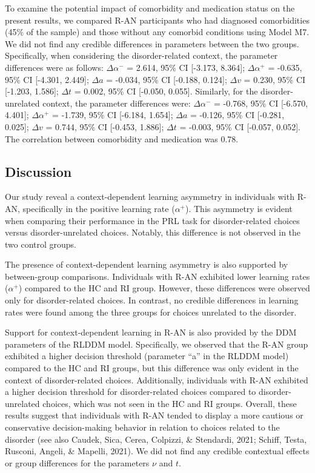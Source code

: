 \documentclass[
  man,floatsintext]{apa6}
\begin{document}
To examine the potential impact of comorbidity and medication status on the present results, we compared R-AN participants who had diagnosed comorbidities (45\% of the sample) and those without any comorbid conditions using Model M7. We did not find any credible differences in parameters between the two groups. Specifically, when considering the disorder-related context, the parameter differences were as follows: \(\Delta \alpha^-\) = 2.614, 95\% CI {[}-3.173, 8.364{]}; \(\Delta \alpha^+\) = -0.635, 95\% CI {[}-4.301, 2.449{]}; \(\Delta a\) = -0.034, 95\% CI {[}-0.188, 0.124{]}; \(\Delta v\) = 0.230, 95\% CI {[}-1.203, 1.586{]}; \(\Delta t\) = 0.002, 95\% CI {[}-0.050, 0.055{]}. Similarly, for the disorder-unrelated context, the parameter differences were: \(\Delta \alpha^-\) = -0.768, 95\% CI {[}-6.570, 4.401{]}; \(\Delta \alpha^+\) = -1.739, 95\% CI {[}-6.184, 1.654{]}; \(\Delta a\) = -0.126, 95\% CI {[}-0.281, 0.025{]}; \(\Delta v\) = 0.744, 95\% CI {[}-0.453, 1.886{]}; \(\Delta t\) = -0.003, 95\% CI {[}-0.057, 0.052{]}. The correlation between comorbidity and medication was 0.78.

\hypertarget{discussion}{%
\subsection{Discussion}\label{discussion}}

Our study reveal a context-dependent learning asymmetry in individuals with R-AN, specifically in the positive learning rate (\(\alpha^+\)). This asymmetry is evident when comparing their performance in the PRL task for disorder-related choices versus disorder-unrelated choices. Notably, this difference is not observed in the two control groups.

The presence of context-dependent learning asymmetry is also supported by between-group comparisons. Individuals with R-AN exhibited lower learning rates (\(\alpha^+\)) compared to the HC and RI group. However, these differences were observed only for disorder-related choices. In contrast, no credible differences in learning rates were found among the three groups for choices unrelated to the disorder.

Support for context-dependent learning in R-AN is also provided by the DDM parameters of the RLDDM model. Specifically, we observed that the R-AN group exhibited a higher decision threshold (parameter ``a'' in the RLDDM model) compared to the HC and RI groups, but this difference was only evident in the context of disorder-related choices. Additionally, individuals with R-AN exhibited a higher decision threshold for disorder-related choices compared to disorder-unrelated choices, which was not seen in the HC and RI groups. Overall, these results suggest that individuals with R-AN tended to display a more cautious or conservative decision-making behavior in relation to choices related to the disorder (see also Caudek, Sica, Cerea, Colpizzi, \& Stendardi, 2021; Schiff, Testa, Rusconi, Angeli, \& Mapelli, 2021). We did not find any credible contextual effects or group differences for the parameters \(\nu\) and \(t\).
\end{document}
